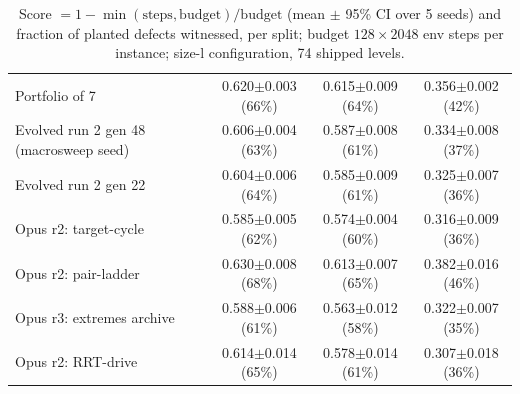 \begin{table}[t]
\begin{tabular}{lccc}
Portfolio of 7 & 0.620$\pm$0.003 (66\%) & 0.615$\pm$0.009 (64\%) & 0.356$\pm$0.002 (42\%) \\
Evolved run 2 gen 48 (macrosweep seed) & 0.606$\pm$0.004 (63\%) & 0.587$\pm$0.008 (61\%) & 0.334$\pm$0.008 (37\%) \\
Evolved run 2 gen 22 & 0.604$\pm$0.006 (64\%) & 0.585$\pm$0.009 (61\%) & 0.325$\pm$0.007 (36\%) \\
Opus r2: target-cycle & 0.585$\pm$0.005 (62\%) & 0.574$\pm$0.004 (60\%) & 0.316$\pm$0.009 (36\%) \\
Opus r2: pair-ladder & 0.630$\pm$0.008 (68\%) & 0.613$\pm$0.007 (65\%) & 0.382$\pm$0.016 (46\%) \\
Opus r3: extremes archive & 0.588$\pm$0.006 (61\%) & 0.563$\pm$0.012 (58\%) & 0.322$\pm$0.007 (35\%) \\
Opus r2: RRT-drive & 0.614$\pm$0.014 (65\%) & 0.578$\pm$0.014 (61\%) & 0.307$\pm$0.018 (36\%) \\
\bottomrule
\end{tabular}
\caption{Score $=1-\min(\text{steps},\text{budget})/\text{budget}$ (mean $\pm$ 95\% CI over 5 seeds) and fraction of planted defects witnessed, per split; budget $128\times2048$ env steps per instance; size-l configuration, 74 shipped levels.}
\label{tab:transfer_full}
\end{table}